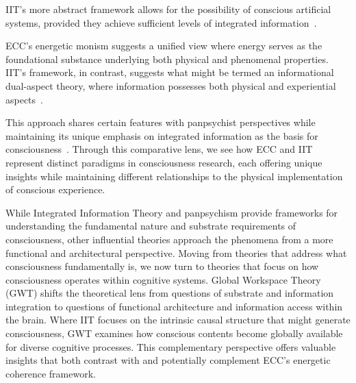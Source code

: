 IIT's more abstract framework allows for the possibility of conscious artificial systems, provided they achieve sufficient levels of integrated information~\cite{Tononi2021, butlin2023consciousnessartificialintelligenceinsights}.

ECC's energetic monism suggests a unified view where energy serves as the foundational substance underlying both physical and phenomenal properties. IIT's framework, in contrast, suggests what might be termed an informational dual-aspect theory, where information possesses both physical and experiential aspects~\cite{Tononi2016, Koch2019}. 

This approach shares certain features with panpsychist perspectives while maintaining its unique emphasis on integrated information as the basis for consciousness~\cite{Mathews2011, Strawson2006}. Through this comparative lens, we see how ECC and IIT represent distinct paradigms in consciousness research, each offering unique insights while maintaining different relationships to the physical implementation of conscious experience.

While Integrated Information Theory and panpsychism provide frameworks for understanding the fundamental nature and substrate requirements of consciousness, other influential theories approach the phenomena from a more functional and architectural perspective. Moving from theories that address what consciousness fundamentally is, we now turn to theories that focus on how consciousness operates within cognitive systems. Global Workspace Theory (GWT) shifts the theoretical lens from questions of substrate and information integration to questions of functional architecture and information access within the brain. Where IIT focuses on the intrinsic causal structure that might generate consciousness, GWT examines how conscious contents become globally available for diverse cognitive processes. This complementary perspective offers valuable insights that both contrast with and potentially complement ECC's energetic coherence framework.
